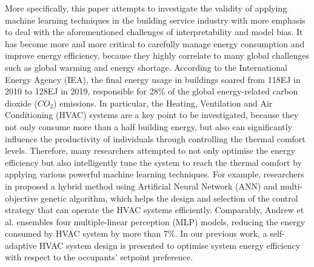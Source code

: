 \documentclass[11pt]{article}
\begin{document}
More specifically, this paper attempts to investigate the validity of applying machine learning techniques in the building service industry with more emphasis to deal with the aforementioned challenges of interpretability and model bias. It has become more and more critical to carefully manage energy consumption and improve energy efficiency, because they highly correlate to many global challenges such as global warming and energy shortage. According to the International Energy Agency (IEA), the final energy usage in buildings soared from 118EJ in 2010 to 128EJ in 2019, responsible for 28\% of the global energy-related carbon dioxide ($CO_2$) emissions\citep{trackBuilding2020}. In particular, the Heating, Ventilation and Air Conditioning (HVAC) systems are a key point to be investigated, because they not only consume more than a half building energy\citep{chua2013achieving}, but also can significantly influence the productivity of individuals through controlling the thermal comfort levels\citep{shaikh2014review}. Therefore, many researchers attempted to not only optimise the energy efficiency but also intelligently tune the system to reach the thermal comfort by applying various powerful machine learning techniques. For example, researchers in\citep{satrio2019optimization} proposed a hybrid method using Artificial Neural Network (ANN) and multi-objective genetic algorithm, which helps the design and selection of the control strategy that can operate the HVAC systems efficiently. Comparably, Andrew et al. ensembles four multiple-linear perception (MLP) models, reducing the energy consumed by HVAC system by more than 7\%\citep{liu2019novel}. In our previous work\citep{grammenos2021analysis}, a self-adaptive HVAC system design is presented to optimise system energy efficiency with respect to the occupants’ setpoint preference. 
\end{document}
